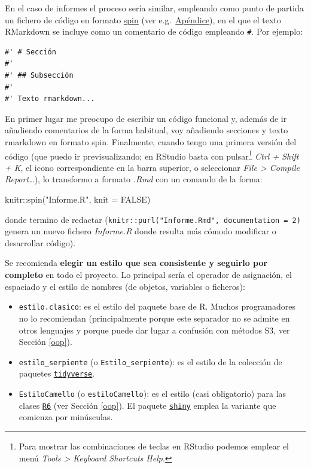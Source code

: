 \documentclass[
]{book}
\newenvironment{Shaded}{\begin{snugshade}}{\end{snugshade}}
\newcommand{\AttributeTok}[1]{\textcolor[rgb]{0.77,0.63,0.00}{#1}}
\newcommand{\ConstantTok}[1]{\textcolor[rgb]{0.00,0.00,0.00}{#1}}
\newcommand{\FunctionTok}[1]{\textcolor[rgb]{0.00,0.00,0.00}{#1}}
\newcommand{\NormalTok}[1]{#1}
\newcommand{\SpecialCharTok}[1]{\textcolor[rgb]{0.00,0.00,0.00}{#1}}
\newcommand{\StringTok}[1]{\textcolor[rgb]{0.31,0.60,0.02}{#1}}
\theoremstyle{break}
\theoremstyle{nonumberplain}
\begin{document}
En el caso de informes el proceso sería similar, empleando como punto de partida un fichero de código en formato \href{https://rubenfcasal.github.io/bookdown_intro/rmarkdown.html\#spin}{spin} (ver e.g.~\href{https://rubenfcasal.github.io/bookdown_intro/rmarkdown.html\#spin}{Apéndice}), en el que el texto RMarkdown se incluye como un comentario de código empleando \texttt{\#\textquotesingle{}}. Por ejemplo:

\begin{verbatim}
#' # Sección
#'
#' ## Subsección
#'
#' Texto rmarkdown...
\end{verbatim}

En primer lugar me preocupo de escribir un código funcional y, además de ir añadiendo comentarios de la forma habitual, voy añadiendo secciones y texto rmarkdown en formato spin.
Finalmente, cuando tengo una primera versión del código (que puedo ir previsualizando; en RStudio basta con pulsar\footnote{Para mostrar las combinaciones de teclas en RStudio podemos emplear el menú \emph{Tools \textgreater{} Keyboard Shortcuts Help}.} \emph{Ctrl + Shift + K}, el icono correspondiente en la barra superior, o seleccionar \emph{File \textgreater{} Compile Report\ldots{}}), lo transformo a formato \emph{.Rmd} con un comando de la forma:

\begin{Shaded}
\begin{Highlighting}[]
\NormalTok{knitr}\SpecialCharTok{::}\FunctionTok{spin}\NormalTok{(}\StringTok{"Informe.R"}\NormalTok{, }\AttributeTok{knit =} \ConstantTok{FALSE}\NormalTok{)}
\end{Highlighting}
\end{Shaded}

donde termino de redactar (\texttt{knitr::purl("Informe.Rmd",\ documentation\ =\ 2)} genera un nuevo fichero \emph{Informe.R} donde resulta más cómodo modificar o desarrollar código).

Se recomienda \textbf{elegir un estilo que sea consistente y seguirlo por completo} en todo el proyecto.
Lo principal sería el operador de asignación, el espaciado y el estilo de nombres (de objetos, variables o ficheros):

\begin{itemize}
\item
  \texttt{estilo.clasico}: es el estilo del paquete base de R. Muchos programadores no lo recomiendan (principalmente porque este separador no se admite en otros lenguajes y porque puede dar lugar a confusión con métodos S3, ver Sección \ref{oop}).
\item
  \texttt{estilo\_serpiente} (o \texttt{Estilo\_serpiente}): es el estilo de la colección de paquetes \href{https://tidyverse.tidyverse.org}{\texttt{tidyverse}}.
\item
  \texttt{EstiloCamello} (o \texttt{estiloCamello}): es el estilo (casi obligatorio) para las clases \href{https://r6.r-lib.org}{\texttt{R6}} (ver Sección \ref{oop}). El paquete \href{https://shiny.rstudio.com/}{\texttt{shiny}} emplea la variante que comienza por minúsculas.
\end{itemize}
\end{document}
